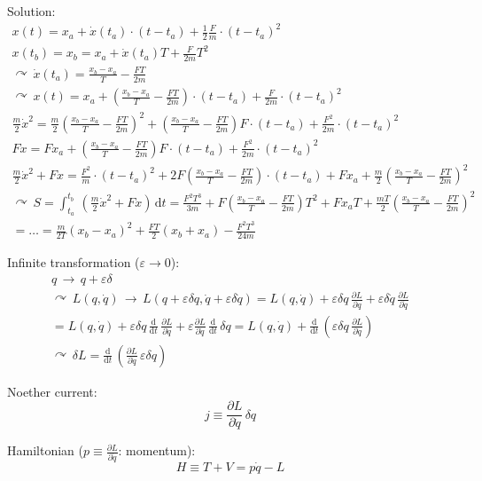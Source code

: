 \documentclass[fontsize=11pt,a4paper]{scrartcl}
\begin{document}
Solution:
\begin{gather*}
	x(t)=x_a+\dot x(t_a)\cdot(t-t_a)+\frac{1}{2}\frac{F}{m}\cdot(t-t_a)^2\\
	x(t_b)=x_b=x_a+\dot x(t_a)T+\frac{F}{2m}T^2\\
	\curvearrowright\,\dot x(t_a)=\frac{x_b-x_a}{T}-\frac{FT}{2m}\\
	\curvearrowright\,x(t)=x_a+\left(\frac{x_b-x_a}{T}-\frac{FT}{2m}\right)\cdot(t-t_a)+\frac{F}{2m}\cdot(t-t_a)^2\\
	\frac{m}{2}\dot x^2=\frac{m}{2}\left(\frac{x_b-x_a}{T}-\frac{FT}{2m}\right)^2+\left(\frac{x_b-x_a}{T}-\frac{FT}{2m}\right)F\cdot(t-t_a)+\frac{F^2}{2m}\cdot(t-t_a)^2\\
	Fx=Fx_a+\left(\frac{x_b-x_a}{T}-\frac{FT}{2m}\right)F\cdot(t-t_a)+\frac{F^2}{2m}\cdot(t-t_a)^2\\
	\frac{m}{2}\dot x^2+Fx=\frac{F^2}{m}\cdot(t-t_a)^2+2F\left(\frac{x_b-x_a}{T}-\frac{FT}{2m}\right)\cdot(t-t_a)+Fx_a+\frac{m}{2}\left(\frac{x_b-x_a}{T}-\frac{FT}{2m}\right)^2\\
	\curvearrowright\,S=\int_{t_a}^{t_b}\,\left(\frac{m}{2}\dot x^2+Fx\right)\,\mathrm{d}t=\frac{F^2 T^3}{3m}+F\left(\frac{x_b-x_a}{T}-\frac{FT}{2m}\right)T^2+Fx_a T+\frac{mT}{2}\left(\frac{x_b-x_a}{T}-\frac{FT}{2m}\right)^2\\
	=\dots=\frac{m}{2T}(x_b-x_a)^2+\frac{FT}{2}(x_b+x_a)-\frac{F^2 T^3}{24m}
\end{gather*}


Infinite transformation ($\varepsilon\to 0$):
\begin{gather*}
	q\,\to\,q+\varepsilon\delta\\
	\curvearrowright\,L(q,\dot q)\,\to\,L(q+\varepsilon\delta q,\dot q+\varepsilon\delta\dot q)=L(q,\dot q)+\varepsilon\delta q\,\frac{\partial L}{\partial q}+\varepsilon\delta\dot q\,\frac{\partial L}{\partial\dot q}\\=L(q,\dot q)+\varepsilon\delta q\,\frac{\mathrm{d}}{\mathrm{d}t}\,\frac{\partial L}{\partial\dot q}+\varepsilon\frac{\partial L}{\partial\dot q}\,\frac{\mathrm{d}}{\mathrm{d}t}\,\delta q
	=L(q,\dot q)+\frac{\mathrm{d}}{\mathrm{d}t}\,\left(\varepsilon\delta q\,\frac{\partial L}{\partial\dot q}\right)\\
	\curvearrowright\,\delta L=\frac{\mathrm{d}}{\mathrm{d}t}\,\left(\frac{\partial L}{\partial\dot q}\,\varepsilon\delta q\right)
\end{gather*}

Noether current:
\[
	j\equiv\frac{\partial L}{\partial\dot q}\,\delta q
\]

Hamiltonian ($p\equiv\frac{\partial L}{\partial\dot q}$: momentum):
\[
	H\equiv T+V=p\dot q-L
\]
\end{document}
